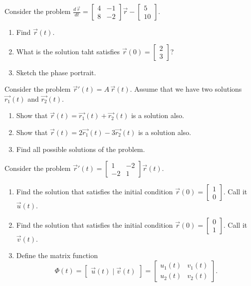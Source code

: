 \begin{exercises}
\begin{problist}
	\prob Consider the problem $
\frac{d \,\vec{r}}{dt} = \begin{bmatrix} 4 & -1 \\ 8 & -2\end{bmatrix} \vec{r} - \begin{bmatrix} 5 \\ 10 \end{bmatrix}$.

	\begin{enumerate}
		\item Find $\vec{r}(t)$.
		\item What is the solution taht satisfies $\vec{r}(0) = \begin{bmatrix} 2\\3 \end{bmatrix}$?
		\item Sketch the phase portrait.
	\end{enumerate}

	
	\prob \label{prob:sys-superposition}Consider the problem \quad $\vec{r}'(t) = A \, \vec{r}(t)$.
	Assume that we have two solutions $\vec{r_1}(t)$ and $\vec{r_2}(t)$.
	\begin{enumerate}
		\item Show that $\vec{r}(t) = \vec{r_1}(t) + \vec{r_2}(t)$ is a solution also.
		\item Show that $\vec{r}(t) = 2\vec{r_1}(t) - 3\vec{r_2}(t)$ is a solution also.
		\item Find all possible solutions of the problem.
	\end{enumerate}
	
	
		\prob Consider the problem $\vec{r}'(t) = \begin{bmatrix} 1 & -2 \\ -2 & 1 \end{bmatrix} \vec{r}(t)$.
		\begin{enumerate}
			\item Find the solution that satisfies the initial condition $\vec{r}(0)=\begin{bmatrix}1 \\ 0\end{bmatrix}$. Call it $\vec{u}(t)$.
			\item Find the solution that satisfies the initial condition $\vec{r}(0)=\begin{bmatrix}0 \\ 1\end{bmatrix}$. Call it $\vec{v}(t)$.
			\item Define the matrix function
			$$ \Phi(t) = \begin{bmatrix} \vec{u}(t) \; | \; \vec{v}(t) \end{bmatrix} = \begin{bmatrix} u_1(t) & v_1(t) \\ u_2(t) & v_2(t) \end{bmatrix}.$$
			

\end{enumerate}
\end{problist}
\end{exercises}
